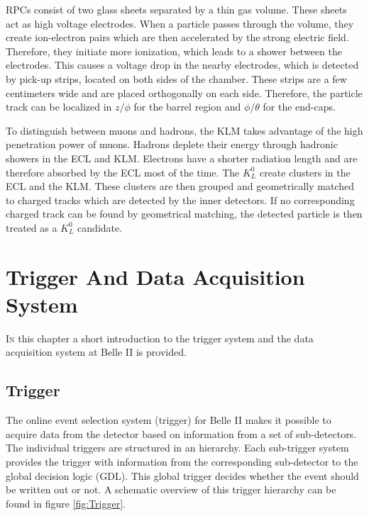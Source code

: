 \documentclass[a4paper,11pt,twosided,final,german,openbib,pdftex,listof=totoc,bibliography=totoc]{scrbook}
\begin{document}
RPCs consist of two glass sheets separated by a thin gas volume. These sheets act as high voltage electrodes. When a particle passes through the volume, they create ion-electron pairs which are then accelerated by the strong electric field. Therefore, they initiate more ionization, which leads to a shower between the electrodes. This causes a voltage drop in the nearby electrodes, which is detected by pick-up strips, located on both sides of the chamber. These strips are a few centimeters wide and are placed orthogonally on each side. Therefore, the particle track can be localized in $z/\phi$ for the barrel region and $\phi/\theta$ for the end-caps.

To distinguish between muons and hadrons, the KLM takes advantage of the high penetration power of muons. Hadrons deplete their energy through hadronic showers in the ECL and KLM. Electrons have a shorter radiation length and are therefore absorbed by the ECL most of the time. The $K_L^0$ create clusters in the ECL and the KLM. These clusters are then grouped and geometrically matched to charged tracks which are detected by the inner detectors. If no corresponding charged track can be found by geometrical matching, the detected particle is then treated as a $K_L^0$ candidate.\cite{B2TR}\cite{KLMS}



\chapter{Trigger And Data Acquisition System}
\label{sec:TDAS}


\lettrine{I}{n} this chapter a short introduction to the trigger system and the data acquisition system at Belle II is provided.


\section{Trigger}

The online event selection system (trigger) for Belle II makes it possible to acquire data from the detector based on information from a set of sub-detectors. The individual triggers are structured in an hierarchy. Each sub-trigger system provides the trigger with information from the corresponding sub-detector to the global decision logic (GDL). This global trigger decides whether the event should be written out or not. \cite{B2TR} A schematic overview of this trigger hierarchy can be found in figure \ref{fig:Trigger}.
\end{document}
